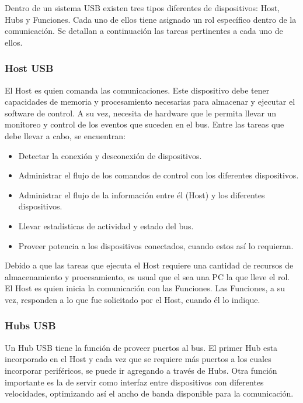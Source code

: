 Dentro de un sistema USB existen tres tipos diferentes de dispositivos: Host, Hubs y Funciones. Cada uno de ellos tiene asignado un rol específico dentro de la comunicación. Se detallan a continuación las tareas pertinentes a cada uno de ellos.

\subsubsection{Host USB}
	El Host es quien comanda las comunicaciones. Este dispositivo debe tener capacidades de memoria y procesamiento necesarias para almacenar y ejecutar el software de control. A su vez, necesita de hardware que le permita llevar un monitoreo y control de los eventos que suceden en el bus. Entre las tareas que debe llevar a cabo, se encuentran:
	
	\begin{itemize}
		\item Detectar la conexión y desconexión de dispositivos.
		\item Administrar el flujo de los comandos de control con los diferentes dispositivos.
		\item Administrar el flujo de la información entre él (Host) y los diferentes dispositivos.
		\item Llevar estadísticas de actividad y estado del bus.
		\item Proveer potencia a los dispositivos conectados, cuando estos así lo requieran.
	\end{itemize}
	
	Debido a que las tareas que ejecuta el Host requiere una cantidad de recursos de almacenamiento y procesamiento, es usual que el sea una PC la que lleve el rol. El Host es quien inicia la comunicación con las Funciones. Las Funciones, a su vez, responden a lo que fue solicitado por el Host, cuando él lo indique.%
	
\subsubsection{Hubs USB}
	Un Hub USB tiene la función de proveer puertos al bus. El primer Hub esta incorporado en el Host y cada vez que se requiere más puertos a los cuales incorporar periféricos, se puede ir agregando a través de Hubs. Otra función importante es la de servir como interfaz entre dispositivos con diferentes velocidades, optimizando así el ancho de banda disponible para la comunicación.%
	
